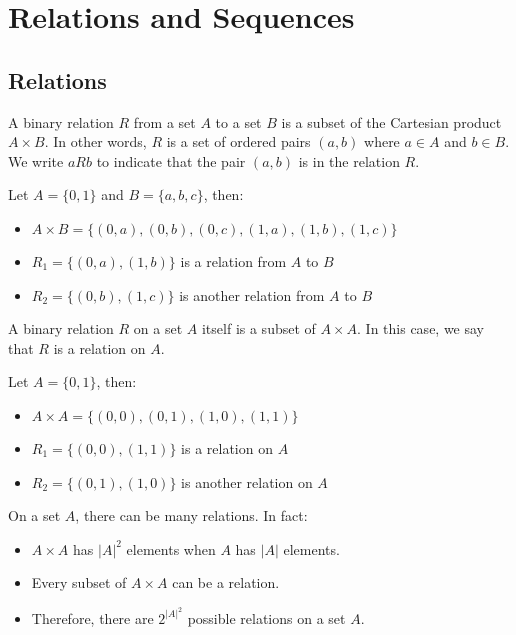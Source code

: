 \chapter{Relations and Sequences}

\section{Relations}
\begin{definition}
    A binary relation $R$ from a set $A$ to a set $B$ is a subset of the Cartesian product $A \times B$. In other words, $R$ is a set of ordered pairs $(a, b)$ where $a \in A$ and $b \in B$. We write $a R b$ to indicate that the pair $(a, b)$ is in the relation $R$.
\end{definition}

\begin{eg}
    Let $A = \{0,1\}$ and $B = \{a,b,c\}$, then:
    \begin{itemize}[itemsep=1pt,label=$\circ$]
        \item $A \times B = \{(0,a), (0,b), (0,c), (1,a), (1,b), (1,c)\}$
        \item $R_1 = \{(0,a), (1,b)\}$ is a relation from $A$ to $B$
        \item $R_2 = \{(0,b), (1,c)\}$ is another relation from $A$ to $B$
    \end{itemize}
\end{eg}
A binary relation $R$ on a set $A$ itself is a subset of $A \times A$. In this case, we say that $R$ is a relation on $A$.
\begin{eg}
    Let $A = \{0,1\}$, then:
    \begin{itemize}[itemsep=1pt,label=$\circ$]
        \item $A \times A = \{(0,0), (0,1), (1,0), (1,1)\}$
        \item $R_1 = \{(0,0), (1,1)\}$ is a relation on $A$
        \item $R_2 = \{(0,1), (1,0)\}$ is another relation on $A$
    \end{itemize}
\end{eg}
On a set $A$, there can be many relations. In fact:
\begin{itemize}[itemsep=1pt,label=$\circ$]
    \item $A \times A$ has $|A|^2$ elements when $A$ has $|A|$ elements.
    \item Every subset of $A \times A$ can be a relation.
    \item Therefore, there are $2^{|A|^2}$ possible relations on a set $A$.
\end{itemize}

